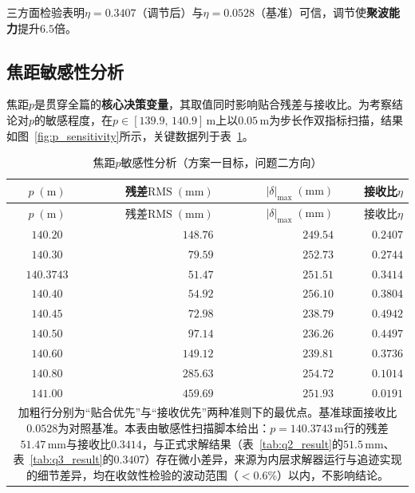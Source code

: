 \documentclass[withoutpreface]{cumcmthesis}
\begin{document}
三方面检验表明$\eta=0.3407$（调节后）与$\eta=0.0528$（基准）可信，调节使\textbf{聚波能力}提升$6.5$倍。

\subsection{焦距敏感性分析}\label{sec:sens}

焦距$p$是贯穿全篇的\textbf{核心决策变量}，其取值同时影响贴合残差与接收比。为考察结论对$p$的敏感程度，在$p\in[139.9,\,140.9]\,\mathrm{m}$上以$0.05\,\mathrm{m}$为步长作双指标扫描，结果如图~\ref{fig:p_sensitivity}所示，关键数据列于表~\ref{tab:sens}。

\begin{longtable}{c r r r}
\caption{焦距$p$敏感性分析（方案一目标，问题二方向）} \label{tab:sens} \\
\toprule
$p\;(\mathrm{m})$ & 残差$\mathrm{RMS}\;(\mathrm{mm})$ & $|\delta|_{\max}\;(\mathrm{mm})$ & 接收比$\eta$ \\
\midrule
\endfirsthead
\toprule
$p\;(\mathrm{m})$ & 残差$\mathrm{RMS}\;(\mathrm{mm})$ & $|\delta|_{\max}\;(\mathrm{mm})$ & 接收比$\eta$ \\
\midrule
\endhead
\bottomrule
\endfoot
\bottomrule
\endlastfoot
$140.20$ & $148.76$ & $249.54$ & $0.2407$ \\
$140.30$ & $79.59$ & $252.73$ & $0.2744$ \\
$\mathbf{140.3743}$ & $\mathbf{51.47}$ & $251.51$ & $0.3414$ \\
$140.40$ & $54.92$ & $256.10$ & $0.3804$ \\
$\mathbf{140.45}$ & $72.98$ & $238.79$ & $\mathbf{0.4942}$ \\
$140.50$ & $97.14$ & $236.26$ & $0.4497$ \\
$140.60$ & $149.12$ & $239.81$ & $0.3736$ \\
$140.80$ & $285.63$ & $254.72$ & $0.1014$ \\
$141.00$ & $459.69$ & $251.93$ & $0.0191$ \\
\midrule
\multicolumn{4}{p{12.6cm}}{\small 加粗行分别为``贴合优先''与``接收优先''两种准则下的最优点。基准球面接收比$0.0528$为对照基准。本表由敏感性扫描脚本给出：$p=140.3743\,\mathrm{m}$行的残差$51.47\,\mathrm{mm}$与接收比$0.3414$，与正式求解结果（表~\ref{tab:q2_result}的$51.5\,\mathrm{mm}$、表~\ref{tab:q3_result}的$0.3407$）存在微小差异，来源为内层求解器运行与追迹实现的细节差异，均在收敛性检验的波动范围（$<0.6\%$）以内，不影响结论。}\\
\bottomrule
\end{longtable}
\end{document}
